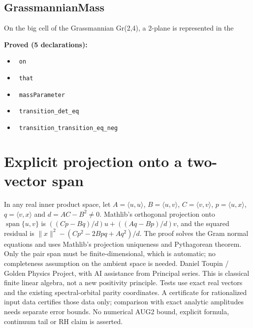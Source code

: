 \documentclass{report}
\theoremstyle{definition}
\begin{document}
\begin{itemize}
\begin{itemize}
\subsection{GrassmannianMass}
On the big cell of the Grassmannian Gr(2,4), a 2-plane is represented in the

\noindent\textbf{Proved (5 declarations):}
\begin{itemize}
  \item {}\leanok\ \texttt{on}
  \item {}\leanok\ \texttt{that}
  \item {}\leanok\ \texttt{massParameter}
  \item {}\leanok\ \texttt{transition\_det\_eq}
  \item {}\leanok\ \texttt{transition\_transition\_eq\_neg}
\end{itemize}

\section{Explicit projection onto a two-vector span}
In any real inner product space, let $A=\langle u,u\rangle$, $B=\langle u,v\rangle$, $C=\langle v,v\rangle$, $p=\langle u,x\rangle$, $q=\langle v,x\rangle$ and $d=AC-B^2\ne0$. Mathlib's orthogonal projection onto $\operatorname{span}\{u,v\}$ is $((Cp-Bq)/d)u+((Aq-Bp)/d)v$, and the squared residual is $\|x\|^2-(Cp^2-2Bpq+Aq^2)/d$. The proof solves the Gram normal equations and uses Mathlib's projection uniqueness and Pythagorean theorem. Only the pair span must be finite-dimensional, which is automatic; no completeness assumption on the ambient space is needed.
Daniel Toupin / Golden Physics Project, with AI assistance from Principal series. This is classical finite linear algebra, not a new positivity principle. Tests use exact real vectors and the existing spectral-orbital parity coordinates. A certificate for rationalized input data certifies those data only; comparison with exact analytic amplitudes needs separate error bounds. No numerical AUG2 bound, explicit formula, continuum tail or RH claim is asserted.


\end{itemize}
\end{itemize}
\end{document}
